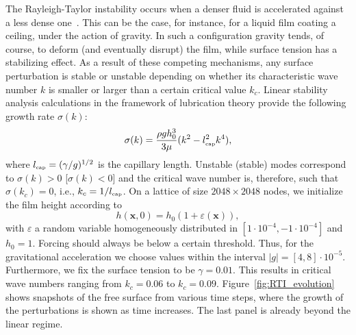 The Rayleigh-Taylor instability occurs when a denser fluid is accelerated against a less dense one~\cite{rayleighInvestigationCharacterEquilibrium1882,taylorInstabilityLiquidSurfaces1997,kullTheoryRayleighTaylorInstability1991,sharpOverviewRayleighTaylorInstability1984}. 
This can be the case, for instance, for a liquid film coating a ceiling, under the action of gravity. 
In such a configuration gravity tends, of course, to deform (and eventually disrupt) the film, while surface tension has a stabilizing effect.
As a result of these competing mechanisms, any surface perturbation is stable or unstable depending on whether its characteristic wave number $k$ is smaller or larger than a certain critical value $k_c$. 
Linear stability analysis calculations in the framework of lubrication theory provide the following growth rate $\sigma(k)$:
\begin{equation}\label{eq:RTgrowth}
    \sigma(k) = \frac{\rho g h_0^3}{3\mu}(k^2 - l_{\mbox{\tiny{cap}}}^2 k^4),
\end{equation}
where $l_{\mbox{\tiny{cap}}} = (\gamma/g)^{1/2}$ is the capillary length. 
Unstable (stable) modes correspond to $\sigma(k)>0$ [$\sigma(k)<0$] and the critical wave number is, therefore, such that $\sigma(k_c)=0$, i.e., $k_c = 1/l_{\mbox{\tiny{cap}}}$.
On a lattice of size $2048 \times 2048$ nodes, we initialize the film height according to
\begin{equation}
  h(\mathbf{x},0) = h_0(1 + \varepsilon(\mathbf{x})),
\end{equation}
with $\varepsilon$ a random variable homogeneously distributed in $[1\cdot 10^{-4},-1\cdot 10^{-4}]$ and $h_0 = 1$. 
Forcing should always be below a certain threshold. Thus, for the gravitational acceleration we choose values within the interval $|g| = [4,8]\cdot 10^{-5}$. 
Furthermore, we fix the surface tension to be $\gamma=0.01$. 
This results in critical wave numbers ranging from $k_c= 0.06$ to $k_c = 0.09$.
Figure~\ref{fig:RTI_evolution} shows snapshots of the free surface from various time steps, where the growth of the perturbations is shown as time increases. 
The last panel is already beyond the linear regime.

